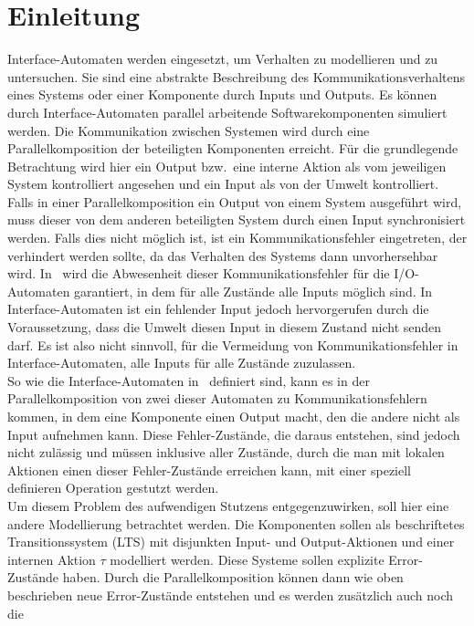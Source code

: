 \chapter{Einleitung}

Interface-Automaten werden eingesetzt, um Verhalten zu modellieren und zu
untersuchen. Sie sind eine abstrakte Beschreibung des Kommunikationsverhaltens
eines Systems oder einer Komponente durch Inputs und Outputs. Es können durch
Interface-Automaten
parallel arbeitende Softwarekomponenten simuliert werden. Die Kommunikation
zwischen  Systemen wird durch eine Parallelkomposition der beteiligten Komponenten
erreicht. Für die grundlegende Betrachtung wird hier ein Output bzw.\ eine
interne Aktion als vom jeweiligen System
kontrolliert angesehen und ein Input als von der Umwelt kontrolliert. Falls in
einer Parallelkomposition ein Output von einem System ausgeführt wird, muss
dieser von dem anderen beteiligten System durch einen
Input synchronisiert werden. Falls dies nicht möglich ist, ist ein
Kommunikationsfehler eingetreten, der verhindert werden sollte, da das
Verhalten des Systems dann unvorhersehbar wird. In~\cite{Lynch1996} wird die
Abwesenheit dieser Kommunikationsfehler
für die I/O-Automaten garantiert, in dem für alle Zustände alle Inputs möglich
sind. In Interface-Automaten ist ein fehlender Input jedoch hervorgerufen durch
die Voraussetzung, dass die Umwelt diesen Input in diesem Zustand nicht senden
darf. Es ist also nicht sinnvoll, für die Vermeidung von Kommunikationsfehler
in Interface-Automaten, alle Inputs für alle Zustände zuzulassen.\\
So wie die Interface-Automaten in~\cite{Alfaro2004} definiert sind, kann es
in der Parallelkomposition von zwei dieser Automaten zu Kommunikationsfehlern
kommen, in dem eine Komponente einen Output macht, den die andere nicht als Input
aufnehmen kann. Diese Fehler-Zustände, die daraus entstehen, sind jedoch nicht
zulässig und müssen inklusive aller Zustände, durch die man mit lokalen
Aktionen einen dieser Fehler-Zustände erreichen kann, mit einer speziell definieren
Operation gestutzt werden.\\
Um diesem Problem des aufwendigen Stutzens entgegenzuwirken, soll hier eine
andere Modellierung betrachtet werden. Die Komponenten sollen als beschriftetes
Transitionssystem (LTS) mit disjunkten Input- und Output-Aktionen und einer
internen Aktion $\tau$ modelliert werden. Diese Systeme sollen explizite
Error-Zustände haben. Durch die Parallelkomposition können dann wie oben
beschrieben neue Error-Zustände entstehen und es werden zusätzlich auch noch die
